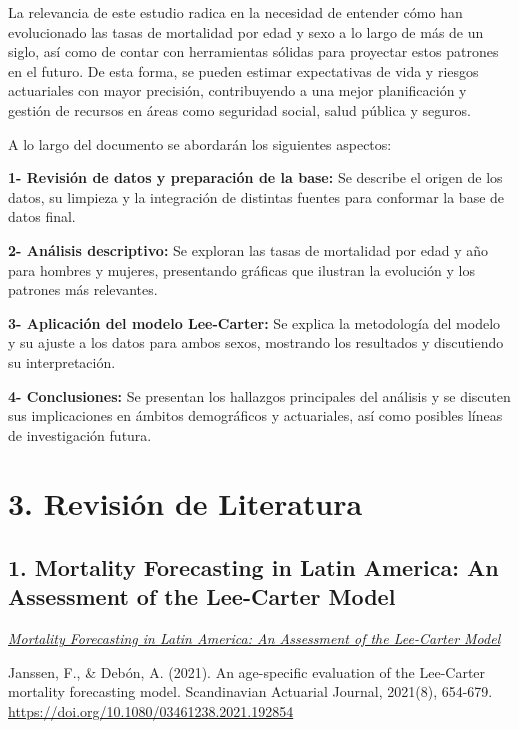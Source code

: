 \documentclass[
]{article}
\begin{document}
La relevancia de este estudio radica en la necesidad de entender cómo
han evolucionado las tasas de mortalidad por edad y sexo a lo largo de
más de un siglo, así como de contar con herramientas sólidas para
proyectar estos patrones en el futuro. De esta forma, se pueden estimar
expectativas de vida y riesgos actuariales con mayor precisión,
contribuyendo a una mejor planificación y gestión de recursos en áreas
como seguridad social, salud pública y seguros.

A lo largo del documento se abordarán los siguientes aspectos:

\textbf{1- Revisión de datos y preparación de la base:} Se describe el
origen de los datos, su limpieza y la integración de distintas fuentes
para conformar la base de datos final.

\textbf{2- Análisis descriptivo:} Se exploran las tasas de mortalidad
por edad y año para hombres y mujeres, presentando gráficas que ilustran
la evolución y los patrones más relevantes.

\textbf{3- Aplicación del modelo Lee-Carter:} Se explica la metodología
del modelo y su ajuste a los datos para ambos sexos, mostrando los
resultados y discutiendo su interpretación.

\textbf{4- Conclusiones:} Se presentan los hallazgos principales del
análisis y se discuten sus implicaciones en ámbitos demográficos y
actuariales, así como posibles líneas de investigación futura.

\hypertarget{revisiuxf3n-de-literatura}{%
\section{3. Revisión de Literatura}\label{revisiuxf3n-de-literatura}}

\hypertarget{mortality-forecasting-in-latin-america-an-assessment-of-the-lee-carter-model}{%
\subsection{1. Mortality Forecasting in Latin America: An Assessment of
the Lee-Carter
Model}\label{mortality-forecasting-in-latin-america-an-assessment-of-the-lee-carter-model}}

\href{https://www.tandfonline.com/doi/epdf/10.1080/03461238.2021.1928542?needAccess=true}{\emph{Mortality
Forecasting in Latin America: An Assessment of the Lee-Carter Model}}

Janssen, F., \& Debón, A. (2021). An age-specific evaluation of the
Lee-Carter mortality forecasting model. Scandinavian Actuarial Journal,
2021(8), 654-679. \url{https://doi.org/10.1080/03461238.2021.192854}
\end{document}
